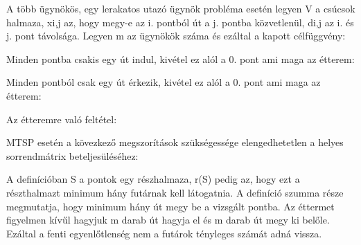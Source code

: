 A több ügynökös, egy lerakatos utazó ügynök probléma esetén legyen V a csúcsok halmaza, xi,j az, hogy megy-e az i. pontból út a j. pontba közvetlenül, di,j az i. és j. pont távolsága. Legyen m az ügynökök száma és ezáltal a kapott célfüggvény:

Minden pontba csakis egy út indul, kivétel ez alól a 0. pont ami maga az étterem:

Minden pontból csak egy út érkezik, kivétel ez alól a 0. pont ami maga az étterem:

Az étteremre való feltétel:

MTSP esetén a kövezkező megszorítások szükségessége elengedhetetlen a helyes sorrendmátrix beteljesüléséhez:

A definícióban S a pontok egy részhalmaza, r(S) pedig az, hogy ezt a részthalmazt minimum hány futárnak kell látogatnia. A definíció szumma része megmutatja, hogy minimum hány út megy be a vizsgált pontba. Az éttermet figyelmen kívűl hagyjuk m darab út hagyja el és m darab út megy ki belőle. Ezáltal a fenti egyenlőtlenség nem a futárok tényleges számát adná vissza. 
